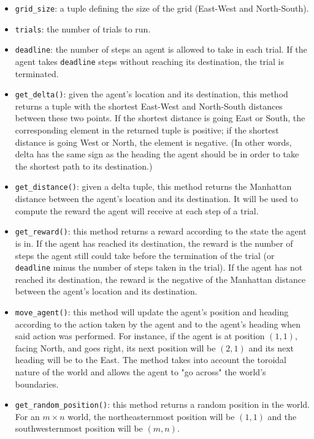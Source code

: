 \documentclass{article}
\begin{document}
\begin{itemize}
    \item \texttt{grid\_size}: a tuple defining the size of the grid (East-West and North-South).
    \item \texttt{trials}: the number of trials to run.
    \item \texttt{deadline}: the number of steps an agent is allowed to take in each trial. If the agent takes \texttt{deadline} steps without reaching its destination, the trial is terminated.
    
    \item \texttt{get\_delta()}: given the agent's location and its destination, this method returns a tuple with the shortest East-West and North-South distances between these two points. If the shortest distance is going East or South, the corresponding element in the returned tuple is positive; if the shortest distance is going West or North, the element is negative. (In other words, delta has the same sign as the heading the agent should be in order to take the shortest path to its destination.)
    
    \item \texttt{get\_distance()}: given a delta tuple, this method returns the Manhattan distance between the agent's location and its destination. It will be used to compute the reward the agent will receive at each step of a trial.
    
    \item \texttt{get\_reward()}: this method returns a reward according to the state the agent is in. If the agent has reached its destination, the reward is the number of steps the agent still could take before the termination of the trial (or \texttt{deadline}  minus the number of steps taken in the trial). If the agent has not reached its destination, the reward is the negative of the Manhattan distance between the agent's location and its destination. 
    
    \item \texttt{move\_agent()}: this method will update the agent's position and heading according to the action taken by the agent and to the agent's heading when said action was performed. For instance, if the agent is at position $(1, 1)$, facing North, and goes right, its next position will be $(2, 1)$ and its next heading will be to the East. The method takes into account the toroidal nature of the world and allows the agent to "go across" the world's boundaries.
    
    \item \texttt{get\_random\_position()}: this method returns a random position in the world. For an $m\times n$ world, the northeasternmost position will be $(1, 1)$ and the southwesternmost position will be $(m, n)$.


\end{itemize}
\end{document}
